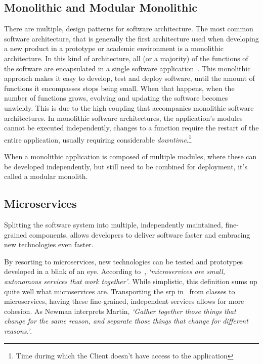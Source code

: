 \subsection{Monolithic and Modular Monolithic}\label{state-of-the-art:ss:monolithic-or-modular-and-their-differences}

There are multiple, design patterns for software architecture. The most common software architecture, that is generally the first architecture used when developing a new product in a prototype or academic environment is a monolithic architecture. In this kind of architecture, all (or a majority) of the functions of the software are encapsulated in a single software application~\Parencite{chen_li_li_2017}. This monolithic approach makes it easy to develop, test and deploy software, until the amount of functions it encompasses stops being small. When that happens, when the number of functions grows, evolving and updating the software becomes unwieldy. This is due to the high coupling that accompanies monolithic software architectures. In monolithic software architectures, the application's modules cannot be executed independently, changes to a function require the restart of the entire application, usually requiring considerable \textit{downtime}.\footnote{\label{foot:downtime}Time during which the Client doesn't have access to the application}



When a monolithic application is composed of multiple modules, where these can be developed independently, but still need to be combined for deployment, it's called a modular monolith. 




\subsection{Microservices}\label{state-of-the-art:ss:microservices}



Splitting the software system into multiple, independently maintained, fine-grained components, allows developers to deliver software faster and embracing new technologies even faster. 

By resorting to microservices, new technologies can be tested and prototypes developed in a blink of an eye.
According to~\Parencite{newman_2015}, \textit{`microservices are small, autonomous services that work together'}. While simplistic, this definition sums up quite well what microservices are. Transporting the \gls{srp} in~\Parencite{martin_2014} from classes to microservices, having these fine-grained, independent services allows for more cohesion. As Newman interprets Martin, \textit{`Gather together those things that change for the
same reason, and separate those things that change for different reasons.'}.


